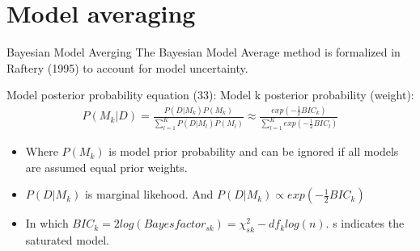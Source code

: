 \documentclass[
  ignorenonframetext,
]{beamer}
\begin{document}
\hypertarget{model-averaging}{%
\section{Model averaging}\label{model-averaging}}

\begin{frame}{Bayesian Model Averging}
\protect\hypertarget{bayesian-model-averging}{}
The Bayesian Model Average method is formalized in Raftery (1995) to
account for model uncertainty.

\begin{block}{Model posterior probability}
\protect\hypertarget{model-posterior-probability}{}
equation (33): Model k posterior probability (weight): \begin{align}
  P(M_k|D) = \frac{P(D|M_k)P(M_k)}{\sum\nolimits_{l=1}^K P(D|M_l)P(M_l)} 
  \approx \frac{exp(-\frac{1}{2}BIC_k)}{\sum\nolimits_{l=1}^K exp(-\frac{1}{2}BIC_l)}
\end{align}

\begin{itemize}
\item
  Where \(P(M_k)\) is model prior probability and can be ignored if all
  models are assumed equal prior weights.
\item
  \(P(D|M_k)\) is marginal likehood. And
  \(P(D|M_k) \propto exp(-\frac{1}{2}BIC_k)\)
\item
  In which
  \(BIC_k = 2log (Bayesfactor_{sk}) = \chi^2_{sk} - df_klog(n)\). s
  indicates the saturated model.
\end{itemize}
\end{block}
\end{frame}
\end{document}
